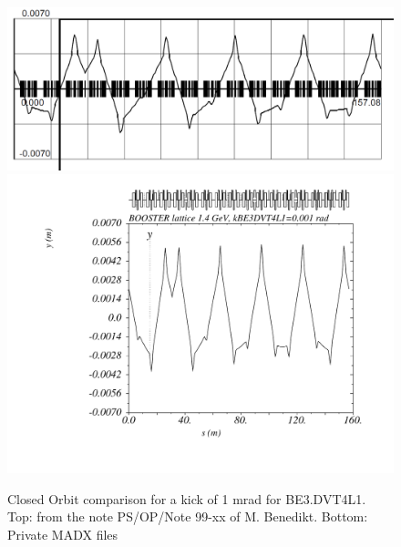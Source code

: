 \documentclass[11pt,letter,english]{article}
\begin{document}
\begin{figure}[!hbtp]
  \begin{center}
    \includegraphics[width=1.0\textwidth]{figs/LINC-BE_DVT4L1.png}
    \includegraphics[width=1.0\textwidth]{figs/psb_orbit_BE3DVT4L1at1mrad.pdf}
    \caption{Closed Orbit comparison for a kick of 1 mrad for BE3.DVT4L1. Top: from the note PS/OP/Note 99-xx of M. Benedikt. Bottom: Private MADX files}
    \label{fig:BE_DVT4L1}
  \end{center}
\end{figure}
\end{document}
